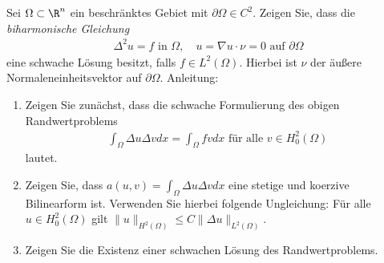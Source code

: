 
\begin{exercise}

Sei $\Omega \subset \R^n$ ein beschränktes Gebiet mit $\partial\Omega \in C^2$.
Zeigen Sie, dass die \textit{biharmonische Gleichung}
\begin{align*}
  \Delta^2 u = f \text{ in } \Omega, \quad u = \nabla u \cdot \nu = 0 \text{ auf } \partial\Omega
\end{align*}
eine schwache Lösung besitzt, falls $f \in L^2(\Omega)$. Hierbei ist $\nu$ der
äußere Normaleneinheitsvektor auf $\partial\Omega$. Anleitung:
\begin{enumerate}[label = (\alph*)]
  \item Zeigen Sie zunächst, dass die schwache Formulierung des obigen Randwertproblems
  \begin{align*}
    \int_\Omega \Delta u \Delta v dx = \int_\Omega f v dx \text{ für alle } v \in H_0^2(\Omega)
  \end{align*}
  lautet.
  \item Zeigen Sie, dass $a(u,v) = \int_\Omega \Delta u \Delta v dx$ eine stetige
  und koerzive Bilinearform ist. Verwenden Sie hierbei folgende Ungleichung:
  Für alle $u \in H_0^2(\Omega)$ gilt $\|u\|_{H^2(\Omega)} \leq C\|\Delta u\|_{L^2(\Omega)}$.
  \item Zeigen Sie die Existenz einer schwachen Lösung des Randwertproblems.
\end{enumerate}
\end{exercise}


\begin{solution}

\phantom{}

\end{solution}

